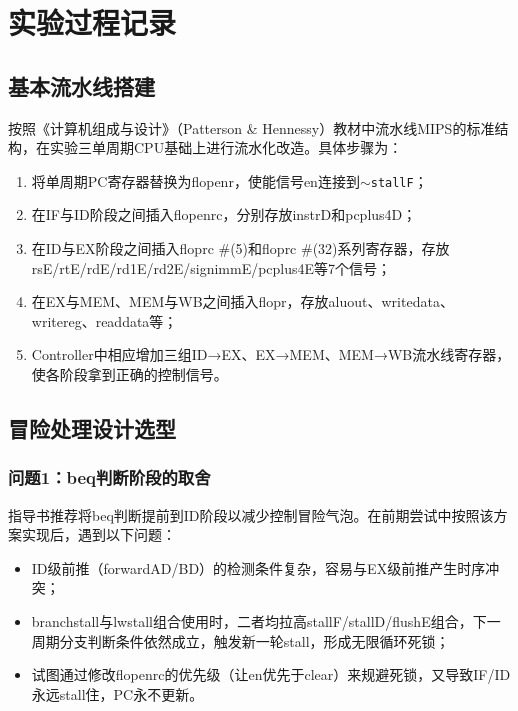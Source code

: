 \section{实验过程记录}

\subsection{基本流水线搭建}

按照《计算机组成与设计》（Patterson \& Hennessy）教材中流水线MIPS的标准结构，在实验三单周期CPU基础上进行流水化改造。具体步骤为：

\begin{enumerate}[(1)]
    \item 将单周期PC寄存器替换为flopenr，使能信号en连接到\texttt{$\sim$stallF}；
    \item 在IF与ID阶段之间插入flopenrc，分别存放instrD和pcplus4D；
    \item 在ID与EX阶段之间插入floprc \#(5)和floprc \#(32)系列寄存器，存放rsE/rtE/rdE/rd1E/rd2E/signimmE/pcplus4E等7个信号；
    \item 在EX与MEM、MEM与WB之间插入flopr，存放aluout、writedata、writereg、readdata等；
    \item Controller中相应增加三组ID→EX、EX→MEM、MEM→WB流水线寄存器，使各阶段拿到正确的控制信号。
\end{enumerate}

\subsection{冒险处理设计选型}

\subsubsection{问题1：beq判断阶段的取舍}

指导书推荐将beq判断提前到ID阶段以减少控制冒险气泡。在前期尝试中按照该方案实现后，遇到以下问题：

\begin{itemize}
    \item ID级前推（forwardAD/BD）的检测条件复杂，容易与EX级前推产生时序冲突；
    \item branchstall与lwstall组合使用时，二者均拉高stallF/stallD/flushE组合，下一周期分支判断条件依然成立，触发新一轮stall，形成无限循环死锁；
    \item 试图通过修改flopenrc的优先级（让en优先于clear）来规避死锁，又导致IF/ID永远stall住，PC永不更新。
\end{itemize}


